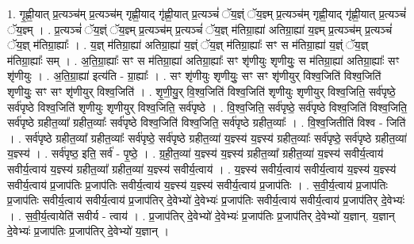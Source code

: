 \documentclass[17pt]{extarticle}
\begin{document}
1. गृ॒ह्णी॒यात् प्र॒त्यञ्च॑म् प्र॒त्यञ्च॑म् गृह्णी॒याद् गृ॑ह्णी॒यात् प्र॒त्यञ्चं॑ ॅय॒ज्ञ्ं ॅय॒ज्ञ्म् प्र॒त्यञ्च॑म् गृह्णी॒याद् गृ॑ह्णी॒यात् प्र॒त्यञ्चं॑ ॅय॒ज्ञ्म् । . प्र॒त्यञ्चं॑ ॅय॒ज्ञ्ं ॅय॒ज्ञ्म् प्र॒त्यञ्च॑म् प्र॒त्यञ्चं॑ ॅय॒ज्ञ् म॑तिग्रा॒ह्या॑ अतिग्रा॒ह्या॑ य॒ज्ञ्म् प्र॒त्यञ्च॑म् प्र॒त्यञ्चं॑ ॅय॒ज्ञ् म॑तिग्रा॒ह्याः᳚ । . य॒ज्ञ् म॑तिग्रा॒ह्या॑ अतिग्रा॒ह्या॑ य॒ज्ञ्ं ॅय॒ज्ञ् म॑तिग्रा॒ह्याः᳚ सꣳ स म॑तिग्रा॒ह्या॑ य॒ज्ञ्ं ॅय॒ज्ञ् म॑तिग्रा॒ह्याः᳚ सम् । . अ॒ति॒ग्रा॒ह्याः᳚ सꣳ स म॑तिग्रा॒ह्या॑ अतिग्रा॒ह्याः᳚ सꣳ शृ॑णीयुः शृणीयुः॒ स म॑तिग्रा॒ह्या॑ अतिग्रा॒ह्याः᳚ सꣳ शृ॑णीयुः । . अ॒ति॒ग्रा॒ह्या॑ इत्य॑ति - ग्रा॒ह्याः᳚ । . सꣳ शृ॑णीयुः शृणीयुः॒ सꣳ सꣳ शृ॑णीयुर् विश्व॒जिति॑ विश्व॒जिति॑ शृणीयुः॒ सꣳ सꣳ शृ॑णीयुर् विश्व॒जिति॑ । . शृ॒णी॒यु॒र् वि॒श्व॒जिति॑ विश्व॒जिति॑ शृणीयुः शृणीयुर् विश्व॒जिति॒ सर्व॑पृष्ठे॒ सर्व॑पृष्ठे विश्व॒जिति॑ शृणीयुः शृणीयुर् विश्व॒जिति॒ सर्व॑पृष्ठे । . वि॒श्व॒जिति॒ सर्व॑पृष्ठे॒ सर्व॑पृष्ठे विश्व॒जिति॑ विश्व॒जिति॒ सर्व॑पृष्ठे ग्रहीत॒व्या᳚ ग्रहीत॒व्याः᳚ सर्व॑पृष्ठे विश्व॒जिति॑ विश्व॒जिति॒ सर्व॑पृष्ठे ग्रहीत॒व्याः᳚ । . वि॒श्व॒जितीति॑ विश्व - जिति॑ । . सर्व॑पृष्ठे ग्रहीत॒व्या᳚ ग्रहीत॒व्याः᳚ सर्व॑पृष्ठे॒ सर्व॑पृष्ठे ग्रहीत॒व्या॑ य॒ज्ञ्स्य॑ य॒ज्ञ्स्य॑ ग्रहीत॒व्याः᳚ सर्व॑पृष्ठे॒ सर्व॑पृष्ठे ग्रहीत॒व्या॑ य॒ज्ञ्स्य॑ । . सर्व॑पृष्ठ॒ इति॒ सर्व॑ - पृ॒ष्ठे॒ । . ग्र॒ही॒त॒व्या॑ य॒ज्ञ्स्य॑ य॒ज्ञ्स्य॑ ग्रहीत॒व्या᳚ ग्रहीत॒व्या॑ य॒ज्ञ्स्य॑ सवीर्य॒त्वाय॑ सवीर्य॒त्वाय॑ य॒ज्ञ्स्य॑ ग्रहीत॒व्या᳚ ग्रहीत॒व्या॑ य॒ज्ञ्स्य॑ सवीर्य॒त्वाय॑ । . य॒ज्ञ्स्य॑ सवीर्य॒त्वाय॑ सवीर्य॒त्वाय॑ य॒ज्ञ्स्य॑ य॒ज्ञ्स्य॑ सवीर्य॒त्वाय॑ प्र॒जाप॑तिः प्र॒जाप॑तिः सवीर्य॒त्वाय॑ य॒ज्ञ्स्य॑ य॒ज्ञ्स्य॑ सवीर्य॒त्वाय॑ प्र॒जाप॑तिः । . स॒वी॒र्य॒त्वाय॑ प्र॒जाप॑तिः प्र॒जाप॑तिः सवीर्य॒त्वाय॑ सवीर्य॒त्वाय॑ प्र॒जाप॑तिर् दे॒वेभ्यो॑ दे॒वेभ्यः॑ प्र॒जाप॑तिः सवीर्य॒त्वाय॑ सवीर्य॒त्वाय॑ प्र॒जाप॑तिर् दे॒वेभ्यः॑ । . स॒वी॒र्य॒त्वायेति॑ सवीर्य - त्वाय॑ । . प्र॒जाप॑तिर् दे॒वेभ्यो॑ दे॒वेभ्यः॑ प्र॒जाप॑तिः प्र॒जाप॑तिर् दे॒वेभ्यो॑ य॒ज्ञान्. य॒ज्ञान् दे॒वेभ्यः॑ प्र॒जाप॑तिः प्र॒जाप॑तिर् दे॒वेभ्यो॑ य॒ज्ञान् । \newline
\end{document}
